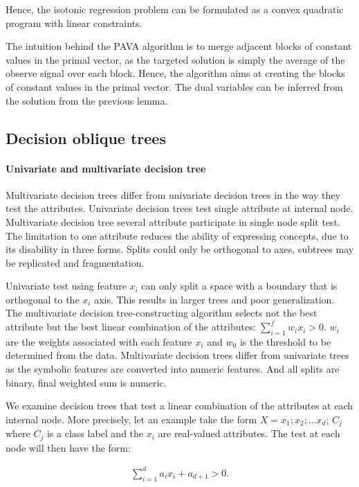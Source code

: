 \documentclass[12pt,preprint]{elsarticle}
\begin{document}
Hence, the isotonic regression problem can be formulated as a convex quadratic program with linear constraints.

The intuition behind the PAVA algorithm is to merge adjacent blocks of constant values in the primal vector, as the targeted solution is simply the average of the observe signal over each block.
Hence, the algorithm aims at creating the blocks of constant values in the primal vector. The dual variables can be inferred from the  solution from the previous lemma.

\subsection{Decision oblique trees}

\paragraph{Univariate and multivariate decision tree}
Multivariate  decision  trees  differ  from  univariate  decision trees in the way they  test the  attributes.   Univariate decision trees  test  single  attribute  at  internal  node.  Multivariate decision tree several attribute participate in single node split test.    The  limitation  to  one  attribute  reduces the  ability  of expressing concepts, due to its disability in three forms.  Splits could only be orthogonal to axes, subtrees may be replicated and fragmentation. 

Univariate test using feature $x_i$ can only split a space with a boundary that is orthogonal to the $x_i$ axis. This results in larger trees and poor generalization.  The  multivariate  decision  tree-constructing algorithm selects not the best attribute but the best linear  combination of the attributes: $\sum_{i=1}^f w_i x_i>0$. $w_i$ are the weights associated with each feature  $x_i$ and  $w_0$ is the threshold to be determined from the data. Multivariate decision trees  differ from  univariate trees  as the  symbolic  features  are  converted  into  numeric  features. And all splits are binary, final weighted sum is numeric.

We examine decision trees that test a linear combination of the attributes
at each internal node. More precisely, let an example take the form $X = x_1; x_2; \dots x_d$; $C_j$
where $C_j$ is a class label and the $x_i$ are real-valued attributes. The test at each node will
then have the form:

\begin{align}
\sum_{i=1}^d a_i x_i + a_{d+1} > 0.
\end{align}
\end{document}
